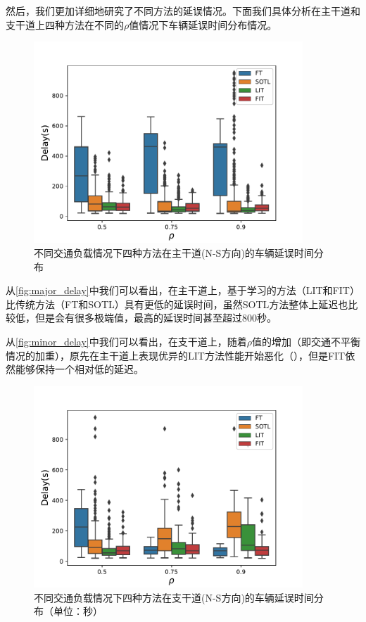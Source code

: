 然后，我们更加详细地研究了不同方法的延误情况。下面我们具体分析在主干道和支干道上四种方法在不同的$\rho$值情况下车辆延误时间分布情况。
\begin{figure}[htb]
    \includegraphics[width=0.9\textwidth]{fig/major_delay.pdf}
    \caption{不同交通负载情况下四种方法在主干道(N-S方向)的车辆延误时间分布}
    \label{fig:major_delay}
\end{figure}
从\autoref{fig:major_delay}中我们可以看出，在主干道上，基于学习的方法（LIT和FIT）比传统方法（FT和SOTL）具有更低的延误时间，虽然SOTL方法整体上延迟也比较低，但是会有很多极端值，最高的延误时间甚至超过800秒。

从\autoref{fig:minor_delay}中我们可以看出，在支干道上，随着$\rho$值的增加（即交通不平衡情况的加重），原先在主干道上表现优异的LIT方法性能开始恶化（），但是FIT依然能够保持一个相对低的延迟。

\begin{figure}[htb]
    \includegraphics[width=0.9\textwidth]{fig/minor_delay.pdf}
    \caption{不同交通负载情况下四种方法在支干道(N-S方向)的车辆延误时间分布（单位：秒）}
    \label{fig:minor_delay}
\end{figure}

